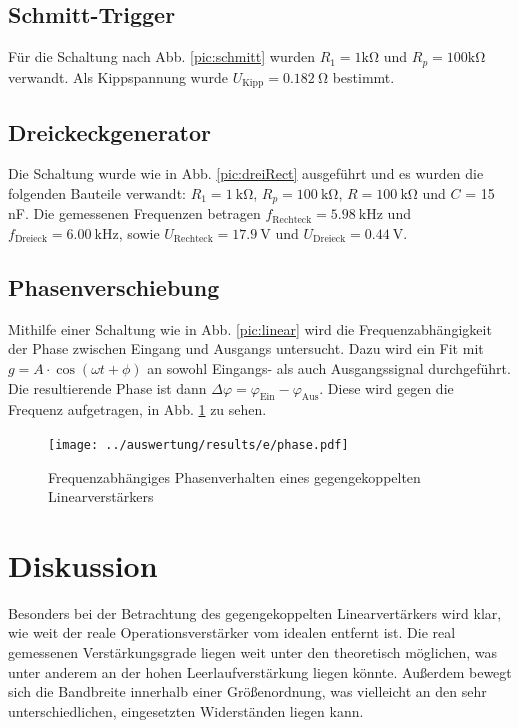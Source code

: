 \subsection{Schmitt-Trigger}
Für die Schaltung nach Abb. \ref{pic:schmitt} wurden $R_1 = 1 \si{\kilo\ohm}$ und $R_p = 100 \si{\kilo\ohm}$ verwandt. Als Kippspannung wurde $U_\text{Kipp} = 0.182\ \si{\ohm}$ bestimmt.

\subsection{Dreickeckgenerator}
Die Schaltung wurde wie in Abb. \ref{pic:dreiRect} ausgeführt und es wurden die folgenden Bauteile verwandt: $R_1 = 1\ \si{\kilo\ohm}$, $R_p = 100\ \si{\kilo\ohm}$, $R = 100\ \si{\kilo\ohm}$ und $C$ = 15 nF. Die gemessenen Frequenzen betragen $f_\text{Rechteck} = 5.98\ \si{\kilo\hertz}$ und $f_\text{Dreieck} = 6.00\ \si{\kilo\hertz}$, sowie $U_\text{Rechteck} = 17.9\ \si{\volt}$ und $U_\text{Dreieck} = 0.44\ \si{\volt}$.

\subsection{Phasenverschiebung}
Mithilfe einer Schaltung wie in Abb. \ref{pic:linear} wird die Frequenzabhängigkeit der Phase zwischen Eingang und Ausgangs untersucht. Dazu wird ein Fit mit $g = A \cdot \cos (\omega t + \phi)$ an sowohl Eingangs- als auch Ausgangssignal durchgeführt. Die resultierende Phase ist dann $\Delta \varphi = \varphi_\text{Ein} - \varphi_\text{Aus}$. Diese wird gegen die Frequenz aufgetragen, in Abb. \ref{pic:e phase} zu sehen.

\begin{figure}
	\centering
	\texttt{[image: ../auswertung/results/e/phase.pdf]}
	\caption{Frequenzabhängiges Phasenverhalten eines gegengekoppelten Linearverstärkers}
	\label{pic:e phase}
\end{figure}

\section{Diskussion}
Besonders bei der Betrachtung des gegengekoppelten Linearvertärkers wird klar, wie weit der reale Operationsverstärker vom idealen entfernt ist. Die real gemessenen Verstärkungsgrade liegen weit unter den theoretisch möglichen, was unter anderem an der hohen Leerlaufverstärkung liegen könnte. Außerdem bewegt sich die Bandbreite innerhalb einer Größenordnung, was vielleicht an den sehr unterschiedlichen, eingesetzten Widerständen liegen kann.

